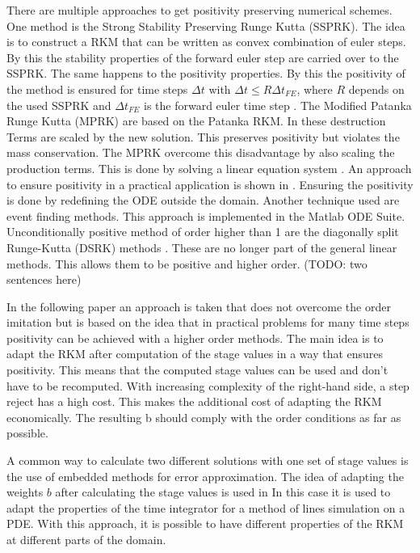 \documentclass{article}
\begin{document}
There are multiple approaches to get positivity preserving numerical schemes.
One method is the Strong Stability Preserving Runge Kutta (SSPRK). 
The idea is to construct a RKM that can be written as convex combination of euler steps. 
By this the stability properties of the forward euler step are carried over to the SSPRK.
The same happens to the positivity properties. By this the positivity of the method is ensured for time steps $\Delta t$ with $\Delta t \leq R \Delta t_{FE}$, where $R$ depends on the used SSPRK and $\Delta t_{FE}$ is the forward euler time step \cite{gottlieb_strong_2011}. 
The Modified Patanka Runge Kutta (MPRK) are 
based on the Patanka RKM. In these destruction Terms are scaled by the new solution. This preserves positivity but violates the mass conservation. The MPRK overcome this disadvantage by also scaling the production terms. This is done by solving a linear equation system \cite{kopecz_comparison_2019}.
An approach to ensure positivity in a practical application is shown in \cite{shampine_non-negative_2005}. Ensuring the positivity is done by redefining the ODE outside the domain. Another technique used are event finding methods. This approach is implemented in the Matlab ODE Suite.
Unconditionally positive method of order higher than 1 are the diagonally split Runge-Kutta (DSRK) methods \cite{horvath_positivity_1998}. These are no longer part of the general linear methods. This allows them to be positive and higher order. (TODO: two sentences here)

In the following paper an approach is taken that does not overcome the order imitation but is based on the idea that in practical problems for many time steps positivity can be achieved with a higher order methods.
The main idea is to adapt the RKM after computation of the stage values in a way that ensures positivity.  
This means that the computed stage values can be used and don't have to be recomputed. With increasing complexity of the right-hand side, a step reject has a high cost. This makes the additional cost of adapting the RKM economically.
The resulting b should comply with the order conditions as far as possible.

A common way to calculate two different solutions with one set of stage values is the use of embedded methods for error approximation. 
The idea of adapting the weights $b$ after calculating the stage values is used in \cite{ketcheson_spatially_2013}
In this case it is used to adapt the properties of the time integrator for a method of lines simulation on a PDE. With this approach, it is possible to have different properties of the RKM at different parts of the domain. 
\end{document}

